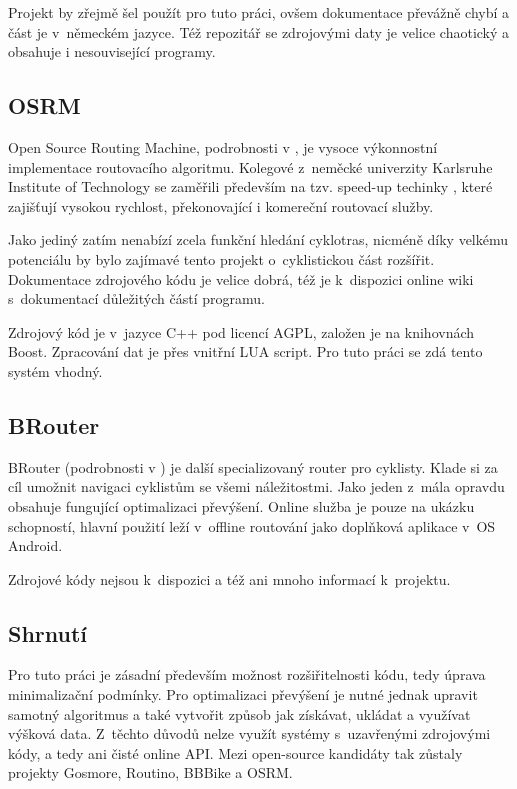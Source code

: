 \documentclass[thesis=B,czech]{FITthesis}[2012/06/26]
\begin{document}
Projekt by zřejmě šel použít pro tuto práci, ovšem dokumentace převážně chybí a část je v~německém jazyce. Též repozitář se zdrojovými daty je velice chaotický a obsahuje i nesouvisející programy.

\subsection{OSRM}
Open Source Routing Machine, podrobnosti v \cite{osrm}, je vysoce výkonnostní implementace routovacího algoritmu. Kolegové z~neměcké univerzity Karlsruhe Institute of Technology se zaměřili především na tzv. speed-up techinky \cite{osrm-article}, které zajišťují vysokou rychlost, překonovající i komereční routovací služby.

Jako jediný zatím nenabízí zcela funkční hledání cyklotras, nicméně díky velkému potenciálu by bylo zajímavé tento projekt o~cyklistickou část rozšířit. Dokumentace zdrojového kódu je velice dobrá, též je k~dispozici online wiki s~dokumentací důležitých částí programu.

Zdrojový kód je v~jazyce C++ pod licencí AGPL, založen je na knihovnách Boost. Zpracování dat je přes vnitřní LUA script. Pro tuto práci se zdá tento systém vhodný.

\subsection{BRouter}
BRouter (podrobnosti v \cite{brouter}) je další specializovaný router pro cyklisty. Klade si za cíl umožnit navigaci cyklistům se všemi náležitostmi. Jako jeden z~mála opravdu obsahuje fungující optimalizaci převýšení. Online služba je pouze na ukázku schopností, hlavní použití leží v~offline routování jako doplňková aplikace v~OS Android.

Zdrojové kódy nejsou k~dispozici a též ani mnoho informací k~projektu.

\subsection{Shrnutí}
Pro tuto práci je zásadní především možnost rozšiřitelnosti kódu, tedy úprava minimalizační podmínky. Pro optimalizaci převýšení je nutné jednak upravit samotný algoritmus a také vytvořit způsob jak získávat, ukládat a využívat výšková data. Z~těchto důvodů nelze využít systémy s~uzavřenými zdrojovými kódy, a tedy ani čisté online API. Mezi open-source kandidáty tak zůstaly projekty Gosmore, Routino, BBBike a OSRM.
\end{document}

